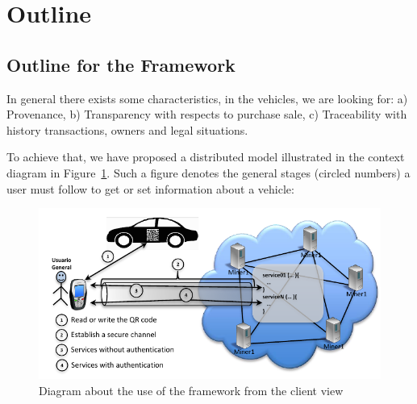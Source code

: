\section{Outline}
\label{sec:outline}


\subsection{Outline for the Framework}
\label{subsec:proposal}
In general there exists some characteristics, in the vehicles, we are looking for:
a) Provenance,
b) Transparency with respects to purchase sale,
c) Traceability with history transactions, owners and legal situations.

To achieve that, we have proposed a distributed model illustrated in the context
diagram in Figure~\ref{fig:flowChartFramework}. Such a figure denotes
the general stages (circled numbers) a user must follow to get or set information about a 
vehicle:
\begin{figure}[bt]
  \centering
    \includegraphics[scale=0.7]{images/gralScheme.pdf}
        \caption{Diagram about the use of the framework from the client view}
    \label{fig:flowChartFramework}
\end{figure}

